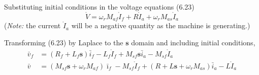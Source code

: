 \documentclass[a4paper,numbers=noenddot,12pt]{scrbook}
\begin{document}
Substituting initial conditions in the voltage equations (6.23)
\begin{equation}
    \mathring{V} = \omega_r M_{af} \mathring{I}_f + R \mathring{I}_a + \omega_r M_{as} \mathring{I}_a
    \label{}
\end{equation}
(\textit{Note:} the current $\mathring{I}_a$ will be a negative quantity as the machine is generating.)

Transforming (6.23) by Laplace to the $\mathbf s$ domain and including initial conditions,
\begin{align}
    \bar v_f & = (R_f + L_f \mathbf{s})\bar i_f - L_f \mathring I_f + M_{sf} \mathbf{s} \bar i_a - M_{sf} \mathring I_a \nonumber \\ %
    \bar v & = (M_{sf} \mathbf{s} + \omega_r M_{af} )\bar \imath_f - M_{sf} \mathring I_f + (R + L \mathbf{s} + \omega_r M_{as})\bar i_a - L\mathring I_a %
    \label{}
\end{align}
\end{document}
